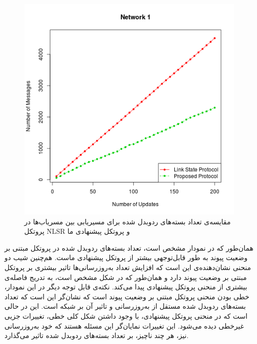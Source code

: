 \begin{figure}[h!]
\centering
\includegraphics[scale=0.8]{./resources/figures/Test1.png}
\caption{مقایسه‌ی تعداد بسته‌های ردوبدل شده برای مسیریابی بین مسریاب‌ها در پروتکل NLSR و پروتکل پیشنهادی ما}
\label{fig:Plot1}
\end{figure}همان‌طور که در نمودار مشخص است، تعداد بسته‌های ردوبدل شده در پروتکل مبتنی بر وضعیت پیوند به طور قابل‌توجهی بیشتر از پروتکل پیشنهادی ماست. هم‌چنین شیب دو منحنی نشان‌دهنده‌ی این است که افزایش تعداد به‌روزرسانی‌ها تاثیر بیشتری بر پروتکل مبنتی بر وضعیت پیوند دارد و همان‌طور که در شکل مشخص است، به تدریج فاصله‌ی بیشتری از منحنی پروتکل پیشنهادی پیدا می‌کند. نکته‌ی قابل توجه دیگر در این نمودار، خطی بودن منحنی پروتکل مبتنی بر وضعیت پیوند است که نشان‌گر این است که تعداد بسته‌های ردو‌بدل شده مستقل از به‌روزرسانی و تاثیر آن بر شبکه است. این در حالی است که در منحنی پروتکل پیشنهادی، با وجود داشتن شکل کلی خطی، تغییرات جزیی غیرخطی دیده می‌شود. این تغییرات نمایان‌گر این مسئله هستند که خود به‌روزرسانی نیز، هر چند ناچیز، بر تعداد بسته‌های ردوبدل شده تاثیر می‌گذارد. 



